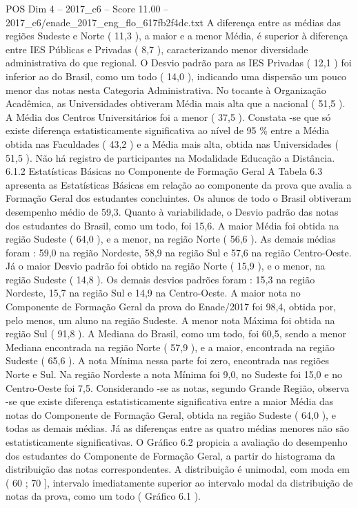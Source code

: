 \begin{textsample}{POS Dim 4 – 2017\_c6 – Score 11.00 – 2017\_c6/enade\_2017\_eng\_flo\_617fb2f4dc.txt}
A diferença entre as médias das regiões Sudeste e Norte ( 11,3 ), a maior e a menor Média, é superior à diferença entre IES Públicas e Privadas ( 8,7 ), caracterizando menor diversidade administrativa do que regional.
O Desvio padrão para as IES Privadas ( 12,1 ) foi inferior ao do Brasil, como um todo ( 14,0 ), indicando uma dispersão um pouco menor das notas nesta Categoria Administrativa.
No tocante à Organização Acadêmica, as Universidades obtiveram Média mais alta que a nacional ( 51,5 ).
A Média dos Centros Universitários foi a menor ( 37,5 ).
Constata -se que só existe diferença estatisticamente significativa ao nível de 95 \% entre a Média obtida nas Faculdades ( 43,2 ) e a Média mais alta, obtida nas Universidades ( 51,5 ).
Não há registro de participantes na Modalidade Educação a Distância. 6.1.2 Estatísticas Básicas no Componente de Formação Geral A Tabela 6.3 apresenta as Estatísticas Básicas em relação ao componente da prova que avalia a Formação Geral dos estudantes concluintes.
Os alunos de todo o Brasil obtiveram desempenho médio de 59,3.
Quanto à variabilidade, o Desvio padrão das notas dos estudantes do Brasil, como um todo, foi 15,6.
A maior Média foi obtida na região Sudeste ( 64,0 ), e a menor, na região Norte ( 56,6 ).
As demais médias foram : 59,0 na região Nordeste, 58,9 na região Sul e 57,6 na região Centro-Oeste.
Já o maior Desvio padrão foi obtido na região Norte ( 15,9 ), e o menor, na região Sudeste ( 14,8 ).
Os demais desvios padrões foram : 15,3 na região Nordeste, 15,7 na região Sul e 14,9 na Centro-Oeste.
A maior nota no Componente de Formação Geral da prova do Enade/2017 foi 98,4, obtida por, pelo menos, um aluno na região Sudeste.
A menor nota Máxima foi obtida na região Sul ( 91,8 ).
A Mediana do Brasil, como um todo, foi 60,5, sendo a menor Mediana encontrada na região Norte ( 57,9 ), e a maior, encontrada na região Sudeste ( 65,6 ).
A nota Mínima nessa parte foi zero, encontrada nas regiões Norte e Sul.
Na região Nordeste a nota Mínima foi 9,0, no Sudeste foi 15,0 e no Centro-Oeste foi 7,5.
Considerando -se as notas, segundo Grande Região, observa -se que existe diferença estatisticamente significativa entre a maior Média das notas do Componente de Formação Geral, obtida na região Sudeste ( 64,0 ), e todas as demais médias.
Já as diferenças entre as quatro médias menores não são estatisticamente significativas.
O Gráfico 6.2 propicia a avaliação do desempenho dos estudantes do Componente de Formação Geral, a partir do histograma da distribuição das notas correspondentes.
A distribuição é unimodal, com moda em ( 60 ; 70 ], intervalo imediatamente superior ao intervalo modal da distribuição de notas da prova, como um todo ( Gráfico 6.1 ).

\end{textsample}
